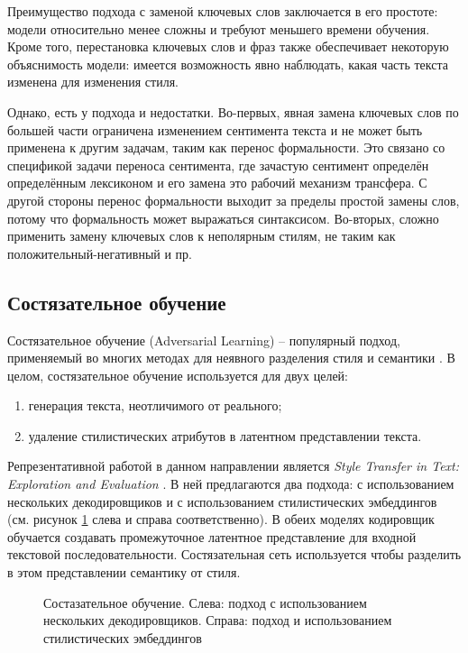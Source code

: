 Преимущество подхода с заменой ключевых слов заключается в его простоте: модели относительно менее сложны и требуют меньшего времени обучения.
Кроме того, перестановка ключевых слов и фраз также обеспечивает некоторую
объяснимость модели: имеется возможность явно наблюдать, какая часть текста изменена для изменения стиля.

Однако, есть у подхода и недостатки. Во-первых, явная замена ключевых слов по большей части ограничена изменением сентимента текста и не может быть применена к другим задачам, таким как перенос формальности.
Это связано со спецификой задачи переноса сентимента, где зачастую сентимент определён определённым лексиконом и его замена это рабочий механизм трансфера.
С другой стороны перенос формальности выходит за пределы простой замены слов, потому что формальность может выражаться синтаксисом.
Во-вторых, сложно применить замену ключевых слов к неполярным стилям, не таким как положительный-негативный и пр.

\subsection{Состязательное обучение}
Состязательное обучение (Adversarial Learning) -- популярный подход, применяемый во многих методах для неявного разделения стиля и семантики \cite{hu2023text}.
В целом, состязательное обучение используется для двух целей:
\begin{enumerate}
    \item генерация текста, неотличимого от реального;
    \item удаление стилистических атрибутов в латентном представлении текста.
\end{enumerate}

Репрезентативной работой в данном направлении является \textit{Style Transfer in Text: Exploration and Evaluation} \cite{fu2017style}.
В ней предлагаются два подхода: с использованием нескольких декодировщиков и с использованием стилистических эмбеддингов (см. рисунок \ref{fig:analysis_adversarial} слева и справа соответственно).
В обеих моделях кодировщик обучается создавать промежуточное латентное представление для входной текстовой последовательности.
Состязательная сеть используется чтобы разделить в этом представлении семантику от стиля.

\begin{figure}[ht]
  \centering
  \caption{Состазательное обучение. Слева: подход с использованием нескольких декодировщиков. Справа: подход и использованием стилистических эмбеддингов}
  \label{fig:analysis_adversarial}
\end{figure}

